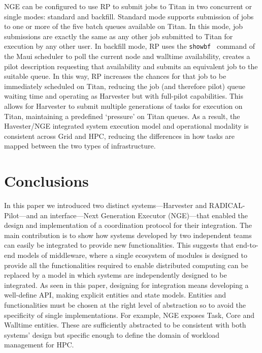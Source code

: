 \documentclass{webofc}
\begin{document}
NGE can be configured to use RP to submit jobs to Titan in two concurrent or
single modes: standard and backfill. Standard mode supports submission of
jobs to one or more of the five batch queues available on Titan. In this
mode, job submissions are exactly the same as any other job submitted to
Titan for execution by any other user. In backfill mode, RP uses the
\texttt{showbf}~\cite{showbf} command of the Maui scheduler to poll the
current node and walltime availability, creates a pilot description
requesting that availability and submits an equivalent job to the suitable
queue. In this way, RP increases the chances for that job to be immediately
scheduled on Titan, reducing the job (and therefore pilot) queue waiting time
and operating as Harvester but with full-pilot capabilities. This allows for
Harvester to submit multiple generations of tasks for execution on Titan,
maintaining a predefined ‘pressure’ on Titan queues. As a result, the
Havester/NGE integrated system execution model and operational modality is
consistent across Grid and HPC, reducing the differences in how tasks are
mapped between the two types of infrastructure.


\section{Conclusions}

In this paper we introduced two distinct systems---Harvester and
RADICAL-Pilot---and an interface---Next Generation Executor (NGE)---that
enabled the design and implementation of a coordination protocol for their
integration. The main contribution is to show how systems developed by two
independent teams can easily be integrated to provide new functionalities.
This suggests that end-to-end models of middleware, where a single ecosystem
of modules is designed to provide all the functionalities required to enable
distributed computing can be replaced by a model in which systems are
independently designed to be integrated. As seen in this paper, designing for
integration means developing a well-define API, making explicit entities and
state models. Entities and functionalities must be chosen at the right level
of abstraction so to avoid the specificity of single implementations. For
example, NGE exposes Task, Core and Walltime entities. These are sufficiently
abstracted to be consistent with both systems’ design but specific enough to
define the domain of workload management for HPC.
\end{document}
